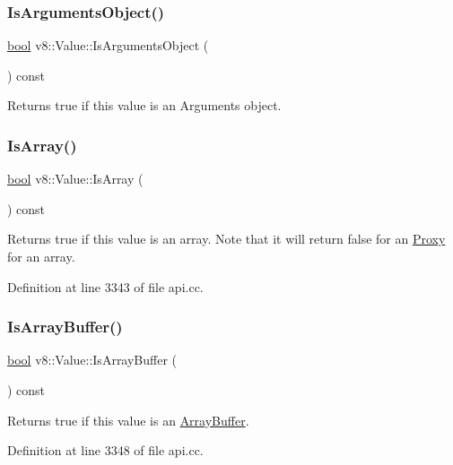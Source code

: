 \subsubsection{\texorpdfstring{Is\+Arguments\+Object()}{IsArgumentsObject()}}
{\footnotesize\ttfamily \mbox{\hyperlink{classbool}{bool}} v8\+::\+Value\+::\+Is\+Arguments\+Object (\begin{DoxyParamCaption}{ }\end{DoxyParamCaption}) const}

Returns true if this value is an Arguments object. \mbox{\label{classv8_1_1Value_a4908fac2c2888ade5d05a8dd312e1fd7}} 
\subsubsection{\texorpdfstring{Is\+Array()}{IsArray()}}
{\footnotesize\ttfamily \mbox{\hyperlink{classbool}{bool}} v8\+::\+Value\+::\+Is\+Array (\begin{DoxyParamCaption}{ }\end{DoxyParamCaption}) const}

Returns true if this value is an array. Note that it will return false for an \mbox{\hyperlink{classv8_1_1Proxy}{Proxy}} for an array. 

Definition at line 3343 of file api.\+cc.

\mbox{\label{classv8_1_1Value_a62c732277023d09f5e5a54eaa2846853}} 
\subsubsection{\texorpdfstring{Is\+Array\+Buffer()}{IsArrayBuffer()}}
{\footnotesize\ttfamily \mbox{\hyperlink{classbool}{bool}} v8\+::\+Value\+::\+Is\+Array\+Buffer (\begin{DoxyParamCaption}{ }\end{DoxyParamCaption}) const}

Returns true if this value is an \mbox{\hyperlink{classv8_1_1ArrayBuffer}{Array\+Buffer}}. 

Definition at line 3348 of file api.\+cc.

\mbox{\label{classv8_1_1Value_ab1ba4b263da3630cf8efd0c6b6e26293}} 
